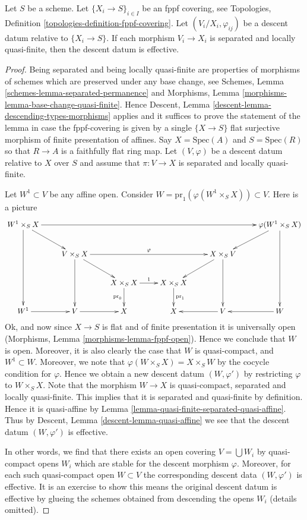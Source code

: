 \begin{lemma}
\label{lemma-separated-locally-quasi-finite-morphisms-fppf-descend}
Let $S$ be a scheme.
Let $\{X_i \to S\}_{i\in I}$ be an fppf covering, see
Topologies, Definition \ref{topologies-definition-fppf-covering}.
Let $(V_i/X_i, \varphi_{ij})$ be a descent datum
relative to $\{X_i \to S\}$. If each morphism
$V_i \to X_i$ is separated and locally quasi-finite,
then the descent datum is effective.
\end{lemma}

\begin{proof}
Being separated and being locally quasi-finite
are properties of morphisms of schemes
which are preserved under any base change, see
Schemes, Lemma \ref{schemes-lemma-separated-permanence} and
Morphisms, Lemma \ref{morphisms-lemma-base-change-quasi-finite}.
Hence Descent, Lemma \ref{descent-lemma-descending-types-morphisms}
applies and it suffices to prove the statement of the lemma
in case the fppf-covering is given by a single
$\{X \to S\}$ flat surjective morphism of finite presentation of affines.
Say $X = \text{Spec}(A)$ and $S = \text{Spec}(R)$ so
that $R \to A$ is a faithfully flat ring map.
Let $(V, \varphi)$ be a descent datum relative to $X$ over $S$
and assume that $\pi : V \to X$ is separated and
locally quasi-finite.

\medskip\noindent
Let $W^1 \subset V$ be any affine open.
Consider $W = \text{pr}_1(\varphi(W^1 \times_S X)) \subset V$.
Here is a picture
$$
\xymatrix{
W^1 \times_S X \ar[rrrrr] \ar[ddd] \ar[rd]
& & & & &
\varphi(W^1 \times_S X) \ar[ddd] \ar[ld] \\
& V \times_S X \ar[rrr]^\varphi \ar[rd] \ar[dd]
& & &
X \times_S V \ar[ld] \ar[dd] & \\
& &
X \times_S X \ar[r]^1 \ar[d]_{\text{pr}_0}
&
X \times_S X \ar[d]^{\text{pr}_1}
& & \\
W^1 \ar[r] &
V \ar[r] &
X &
X &
V \ar[l] &
W \ar[l]
}
$$
Ok, and now since $X \to S$ is flat and of finite presentation it
is universally open (Morphisms, Lemma \ref{morphisms-lemma-fppf-open}).
Hence we conclude that $W$ is open. Moreover, it is
also clearly the case that $W$ is quasi-compact, and
$W^1 \subset W$. Moreover, we note that
$\varphi(W \times_S X) = X \times_S W$ by the cocycle
condition for $\varphi$. Hence we obtain a new descent datum
$(W, \varphi')$ by restricting $\varphi$ to $W \times_S X$.
Note that the morphism $W \to X$ is quasi-compact, separated
and locally quasi-finite. This implies that it is
separated and quasi-finite by definition. Hence it is quasi-affine by
Lemma \ref{lemma-quasi-finite-separated-quasi-affine}.
Thus by
Descent, Lemma \ref{descent-lemma-quasi-affine}
we see that the descent datum
$(W, \varphi')$ is effective.

\medskip\noindent
In other words, we find that there exists an open covering
$V = \bigcup W_i$ by quasi-compact opens $W_i$ which are
stable for the descent morphism $\varphi$.
Moreover, for each such quasi-compact open $W \subset V$
the corresponding descent data $(W, \varphi')$ is effective.
It is an exercise to show this means the
original descent datum is effective by glueing the
schemes obtained from descending the opens $W_i$ (details omitted).
\end{proof}
